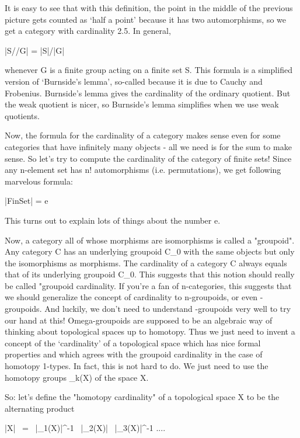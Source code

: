 It is easy to see that with this definition, the point in the middle
of the previous picture gets counted as `half a point' because it has
two automorphisms, so we get a category with cardinality 2.5.  In general,

                        |S//G| = |S|/|G|    

whenever G is a finite group acting on a finite set S.  This formula 
is a simplified version of `Burnside's lemma', so-called because it
is due to Cauchy and Frobenius.  Burnside's lemma gives the cardinality 
of the ordinary quotient.   But the weak quotient is nicer, so Burnside's
lemma simplifies when we use weak quotients.
 
Now, the formula for the cardinality of a category makes sense even
for some categories that have infinitely many objects - all we need is
for the sum to make sense.  So let's try to compute the cardinality
of the category of finite sets!   Since any n-element set has n! 
automorphisms (i.e. permutations), we get following marvelous formula:

                          |FinSet| = e 

This turns out to explain lots of things about the number e.  

Now, a category all of whose morphisms are isomorphisms is called
a "groupoid".  Any category C has an underlying groupoid 
C_{0} with the
same objects but only the isomorphisms as morphisms.  The cardinality 
of a category C always equals that of its underlying groupoid C_{0}.   
This suggests that this notion should really be called "groupoid 
cardinality.   If you're a fan of n-categories, this suggests that 
we should generalize the concept of cardinality to n-groupoids, or 
even \omega -groupoids.   And luckily, we don't need to understand 
\omega -groupoids very well to try our hand at this!  Omega-groupoids 
are supposed to be an algebraic way of thinking about topological spaces 
up to homotopy.  Thus we just need to invent a concept of the `cardinality' 
of a topological space which has nice formal properties and which agrees 
with the groupoid cardinality in the case of homotopy 1-types.  In fact, 
this is not hard to do.  We just need to use the homotopy groups 
\pi _{k}(X) of the space X.  

So: let's define the "homotopy cardinality" of a 
topological space X to be the alternating product 

     |X| \  = \  |\pi _{1}(X)|^{-1} \  
                |\pi _{2}(X)|  \ 
|\pi _{3}(X)|^{-1} ....

